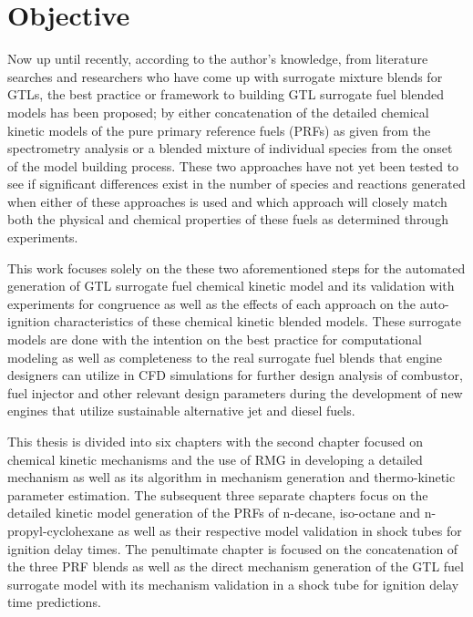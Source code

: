 \section{Objective}
Now up until recently, according to the author's knowledge, from literature searches and researchers who have come up with surrogate mixture blends for GTLs, the best practice or framework to building GTL surrogate fuel blended models has been proposed; by either concatenation of the detailed chemical kinetic models of the pure primary reference fuels (PRFs) as given from the spectrometry analysis or a blended mixture of individual species from the onset of the model building process. These two approaches have not yet been tested to see if significant differences exist in the number of species and reactions generated when either of these approaches is used and which approach will closely match both the physical and chemical properties of these fuels as determined through experiments. 

This work focuses solely on the these two aforementioned steps for the automated generation of GTL surrogate fuel chemical kinetic model and its validation with experiments for congruence as well as the effects of each approach on the auto-ignition characteristics of these chemical kinetic blended models. These surrogate models are done with the intention on the best practice for computational modeling as well as completeness to the real surrogate fuel blends that engine designers can utilize in CFD simulations for further design analysis of combustor, fuel injector and other relevant design parameters during the development of new engines that utilize sustainable alternative jet and diesel fuels. 

This thesis is divided into six chapters with the second chapter focused on chemical kinetic mechanisms and the use of RMG in developing a detailed mechanism as well as its algorithm in mechanism generation and thermo-kinetic parameter estimation. The subsequent three separate chapters focus on the detailed kinetic model generation of the PRFs of n-decane, iso-octane and n-propyl-cyclohexane as well as their respective model validation in shock tubes for ignition delay times. The penultimate chapter is focused on the concatenation of the three PRF blends as well as the direct mechanism generation of the GTL fuel surrogate model with its mechanism validation in a shock tube for ignition delay time predictions. 

